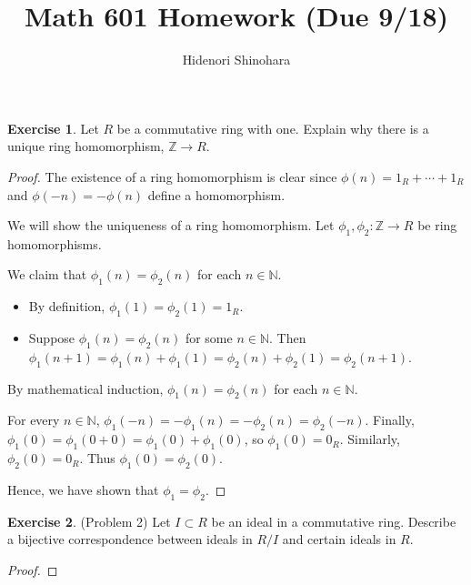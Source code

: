 \documentclass[12pt, psamsfonts]{amsart}
\theoremstyle{definition}
\newtheorem*{exer}{Exercise}
\theoremstyle{remark}
\numberwithin{equation}{section}
\begin{document}
\title{Math 601 Homework (Due 9/18)}
\author{Hidenori Shinohara}
\maketitle

\begin{exer}
  Let $R$ be a commutative ring with one.
  Explain why there is a unique ring homomorphism, $\mathbb{Z} \rightarrow R$.
\end{exer}

\begin{proof}
  The existence of a ring homomorphism is clear since $\phi(n) = 1_R + \cdots + 1_R$ and $\phi(-n) = -\phi(n)$ define a homomorphism.

  We will show the uniqueness of a ring homomorphism.
  Let $\phi_1, \phi_2: \mathbb{Z} \rightarrow R$ be ring homomorphisms.

  We claim that $\phi_1(n) = \phi_2(n)$ for each $n \in \mathbb{N}$.
  \begin{itemize}
    \item
      By definition, $\phi_1(1) = \phi_2(1) = 1_R$.
    \item
      Suppose $\phi_1(n) = \phi_2(n)$ for some $n \in \mathbb{N}$.
      Then $\phi_1(n + 1) = \phi_1(n) + \phi_1(1) = \phi_2(n) + \phi_2(1) = \phi_2(n + 1)$.
  \end{itemize}
  By mathematical induction, $\phi_1(n) = \phi_2(n)$ for each $n \in \mathbb{N}$.

  For every $n \in \mathbb{N}$, $\phi_1(-n) = -\phi_1(n) = -\phi_2(n) = \phi_2(-n)$.
  Finally, $\phi_1(0) = \phi_1(0 + 0) = \phi_1(0) + \phi_1(0)$, so $\phi_1(0) = 0_R$.
  Similarly, $\phi_2(0) = 0_R$.
  Thus $\phi_1(0) = \phi_2(0)$.

  Hence, we have shown that $\phi_1 = \phi_2$.
\end{proof}

\begin{exer}{(Problem 2)}
  Let $I \subset R$ be an ideal in a commutative ring.
  Describe a bijective correspondence between ideals in $R / I$ and certain ideals in $R$.
\end{exer}

\begin{proof}
\end{proof}
\end{document}
